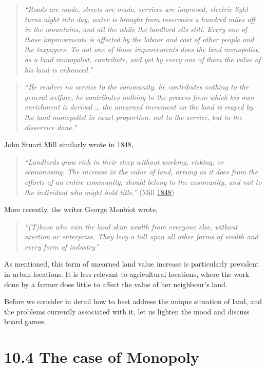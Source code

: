 \documentclass[]{tufte-handout}
\begin{document}
\begin{quote}
\emph{``Roads are made, streets are made, services are improved,
electric light turns night into day, water is brought from reservoirs a
hundred miles off in the mountains, and all the while the landlord sits
still. Every one of those improvements is affected by the labour and
cost of other people and the taxpayers. To not one of those improvements
does the land monopolist, as a land monopolist, contribute, and yet by
every one of them the value of his land is enhanced.''}
\end{quote}

\begin{quote}
\emph{``He renders no service to the community, he contributes nothing
to the general welfare, he contributes nothing to the process from which
his own enrichment is derived \ldots{} the unearned increment on the
land is reaped by the land monopolist in exact proportion, not to the
service, but to the disservice done.''}
\end{quote}

John Stuart Mill similarly wrote in 1848,

\begin{quote}
\emph{``Landlords grow rich in their sleep without working, risking, or
economising. The increase in the value of land, arising as it does from
the efforts of an entire community, should belong to the community, and
not to the individual who might hold title.''} (Mill
\protect\hyperlink{ref-mill1848principles}{1848})
\end{quote}

More recently, the writer George Monbiot wrote,

\begin{quote}
\emph{``(T)hose who own the land skim wealth from everyone else, without
exertion or enterprise. They levy a toll upon all other forms of wealth
and every form of industry'' }
\end{quote}

As mentioned, this form of unearned land value increase is particularly
prevalent in urban locations. It is less relevant to agricultural
locations, where the work done by a farmer does little to affect the
value of her neighbour's land.

Before we consider in detail how to best address the unique situation of
land, and the problems currently associated with it, let us lighten the
mood and discuss board games.

\hypertarget{the-case-of-monopoly}{%
\section{10.4 The case of Monopoly}\label{the-case-of-monopoly}}
\end{document}
